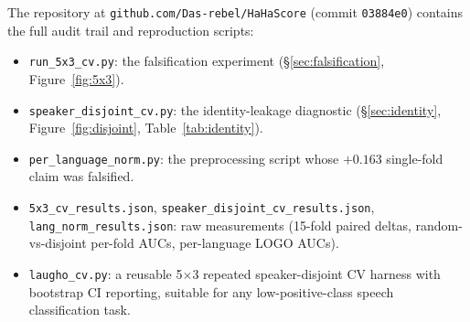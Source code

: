 \documentclass[11pt, letterpaper]{article}
\begin{document}

The repository at \texttt{github.com/Das-rebel/HaHaScore} (commit
\texttt{03884e0}) contains the full audit trail and reproduction scripts:

\begin{itemize}
\item \texttt{run\_5x3\_cv.py}: the falsification experiment
(\S\ref{sec:falsification}, Figure~\ref{fig:5x3}).
\item \texttt{speaker\_disjoint\_cv.py}: the identity-leakage diagnostic
(\S\ref{sec:identity}, Figure~\ref{fig:disjoint}, Table~\ref{tab:identity}).
\item \texttt{per\_language\_norm.py}: the preprocessing script whose $+0.163$
single-fold claim was falsified.
\item \texttt{5x3\_cv\_results.json}, \texttt{speaker\_disjoint\_cv\_results.json},
\texttt{lang\_norm\_results.json}: raw measurements (15-fold paired deltas,
random-vs-disjoint per-fold AUCs, per-language LOGO AUCs).
\item \texttt{laugho\_cv.py}: a reusable 5$\times$3 repeated speaker-disjoint
CV harness with bootstrap CI reporting, suitable for any low-positive-class
speech classification task.
\end{itemize}
\end{document}
